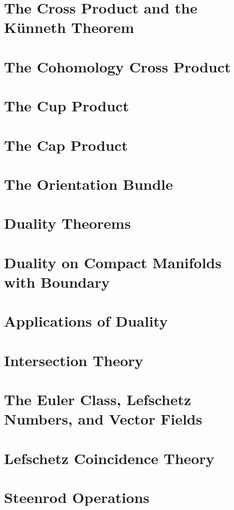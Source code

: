 \documentclass[oneside]{amsbook}
\numberwithin{prob}{section}
\begin{document}
\section{The Cross Product and the Künneth Theorem}

\setcounter{section}{2}
\section{The Cohomology Cross Product}

\section{The Cup Product}

\section{The Cap Product}

\setcounter{section}{6}
\section{The Orientation Bundle}

\section{Duality Theorems}

\section{Duality on Compact Manifolds with Boundary}

\section{Applications of Duality}

\section{Intersection Theory}

\section{The Euler Class, Lefschetz Numbers, and Vector Fields}

\setcounter{section}{13}
\section{Lefschetz Coincidence Theory}

\section{Steenrod Operations}

\setcounter{section}{16}
\end{document}
